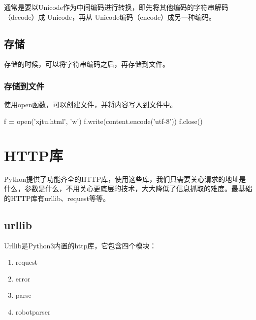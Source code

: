 \documentclass[]{ctexbook}
\newenvironment{Shaded}{\begin{snugshade}}{\end{snugshade}}
\newcommand{\BuiltInTok}[1]{#1}
\newcommand{\NormalTok}[1]{#1}
\newcommand{\OperatorTok}[1]{\textcolor[rgb]{0.81,0.36,0.00}{\textbf{#1}}}
\newcommand{\StringTok}[1]{\textcolor[rgb]{0.31,0.60,0.02}{#1}}
\providecommand{\tightlist}{%
  \setlength{\itemsep}{0pt}\setlength{\parskip}{0pt}}
\begin{document}
通常是要以Unicode作为中间编码进行转换，即先将其他编码的字符串解码（decode）成 Unicode，再从 Unicode编码（encode）成另一种编码。

\hypertarget{ux5b58ux50a8}{%
\section{存储}\label{ux5b58ux50a8}}

存储的时候，可以将字符串编码之后，再存储到文件。

\hypertarget{ux5b58ux50a8ux5230ux6587ux4ef6}{%
\subsection{存储到文件}\label{ux5b58ux50a8ux5230ux6587ux4ef6}}

使用open函数，可以创建文件，并将内容写入到文件中。

\begin{Shaded}
\begin{Highlighting}[]
\NormalTok{f }\OperatorTok{=} \BuiltInTok{open}\NormalTok{(}\StringTok{'xjtu.html'}\NormalTok{, }\StringTok{'w'}\NormalTok{)}
\NormalTok{f.write(content.encode(}\StringTok{'utf-8'}\NormalTok{))}
\NormalTok{f.close()}
\end{Highlighting}
\end{Shaded}

\hypertarget{httplib}{%
\chapter{HTTP库}\label{httplib}}

Python提供了功能齐全的HTTP库，使用这些库，我们只需要关心请求的地址是什么，参数是什么，不用关心更底层的技术，大大降低了信息抓取的难度。最基础的HTTP库有urllib、request等等。

\hypertarget{urllib}{%
\section{urllib}\label{urllib}}

Urllib是Python3内置的http库，它包含四个模块：

\begin{enumerate}
\def\labelenumi{\arabic{enumi}.}
\tightlist
\item
  request
\item
  error
\item
  parse
\item
  robotparser
\end{enumerate}
\end{document}
